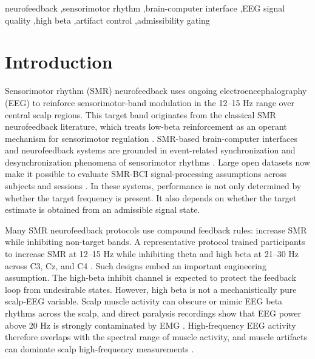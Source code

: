\documentclass[preprint,12pt]{elsarticle}
\begin{document}
\begin{frontmatter}
\begin{keyword}
neurofeedback \sep sensorimotor rhythm \sep brain-computer interface \sep EEG signal quality \sep high beta \sep artifact control \sep admissibility gating
\end{keyword}

\end{frontmatter}

\section{Introduction}

Sensorimotor rhythm (SMR) neurofeedback uses ongoing electroencephalography (EEG) to reinforce sensorimotor-band modulation in the 12--15 Hz range over central scalp regions. This target band originates from the classical SMR neurofeedback literature, which treats low-beta reinforcement as an operant mechanism for sensorimotor regulation \citep{StermanEgner2006,EgnerGruzelier2004}. SMR-based brain-computer interfaces and neurofeedback systems are grounded in event-related synchronization and desynchronization phenomena of sensorimotor rhythms \citep{Pfurtscheller1999ERD,Wolpaw2002BCI}. Large open datasets now make it possible to evaluate SMR-BCI signal-processing assumptions across subjects and sessions \citep{Stieger2021SMRBCI,Iwama2023HDEEG}. In these systems, performance is not only determined by whether the target frequency is present. It also depends on whether the target estimate is obtained from an admissible signal state.

Many SMR neurofeedback protocols use compound feedback rules: increase SMR while inhibiting non-target bands. A representative protocol trained participants to increase SMR at 12--15 Hz while inhibiting theta and high beta at 21--30 Hz across C3, Cz, and C4 \citep{Dessy2020Train}. Such designs embed an important engineering assumption. The high-beta inhibit channel is expected to protect the feedback loop from undesirable states. However, high beta is not a mechanistically pure scalp-EEG variable. Scalp muscle activity can obscure or mimic EEG beta rhythms across the scalp, and direct paralysis recordings show that EEG power above 20 Hz is strongly contaminated by EMG \citep{Goncharova2003EMG,Whitham2007ScalpEMG}. High-frequency EEG activity therefore overlaps with the spectral range of muscle activity, and muscle artifacts can dominate scalp high-frequency measurements \citep{Muthukumaraswamy2013Muscle}.
\end{document}
